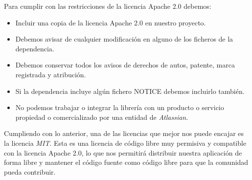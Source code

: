 Para cumplir con las restricciones de la licencia Apache 2.0 debemos:
\begin{itemize}
    \item Incluir una copia de la licencia Apache 2.0 en nuestro proyecto.
    \item Debemos avisar de cualquier modificación en alguno de los ficheros de la dependencia.
    \item Debemos conservar todos los avisos de derechos de autos, patente, marca registrada y atribución.
    \item Si la dependencia incluye algún fichero NOTICE debemos incluirlo también.
    \item No podemos trabajar o integrar la librería con un producto o servicio propiedad o comercializado por una entidad de \textit{Atlassian}.
\end{itemize}

Cumpliendo con lo anterior, una de las licencias que mejor nos puede encajar es la licencia \emph{MIT}. Esta es una licencia de código libre muy permisiva y compatible con la licencia Apache 2.0, lo que nos permitirá distribuir nuestra aplicación de forma libre y mantener el código fuente como código libre para que la comunidad pueda contribuir.